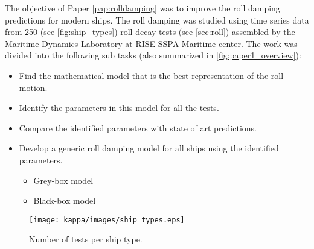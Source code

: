 The objective of Paper \ref{pap:rolldamping} was to improve the roll damping predictions for modern ships. The roll damping was studied using time series data from 250 (see \autoref{fig:ship_types}) roll decay tests (see \autoref{sec:roll}) assembled by the Maritime Dynamics Laboratory at RISE SSPA Maritime center. The work was divided into the following sub tasks (also summarized in \autoref{fig:paper1_overview}): 
\vspace{5pt}
\begin{itemize}
    \setlength\itemsep{5pt}
    \item Find the mathematical model that is the best representation of the roll motion.
    \item Identify the parameters in this model for all the tests.
    \item Compare the identified parameters with state of art predictions.
    \item Develop a generic roll damping model for all ships using the identified parameters.
    \begin{itemize}
        \item Grey-box model
        \item Black-box model
    \end{itemize}
\end{itemize}
\vspace{5pt}
\begin{figure}[!htb]
    \centering
    \texttt{[image: kappa/images/ship\_types.eps]}
    \caption{Number of tests per ship type.}
    \label{fig:ship_types}
\end{figure}
